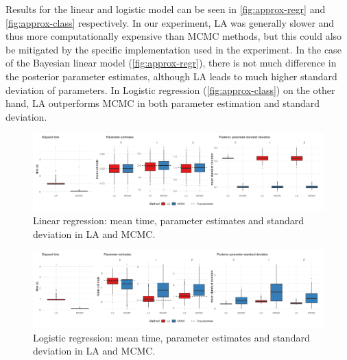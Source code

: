 Results for the linear and logistic model can be seen in \autoref{fig:approx-regr} and \autoref{fig:approx-class} respectively. In our experiment, LA was generally slower and thus more computationally expensive than MCMC methods, but this could also be mitigated by the specific implementation used in the experiment. In the case of the Bayesian linear model (\autoref{fig:approx-regr}), there is not much difference in the posterior parameter estimates, although LA leads to much higher standard deviation of parameters. In Logistic regression (\autoref{fig:approx-class}) on the other hand, LA outperforms MCMC in both parameter estimation and standard deviation.

\begin{figure}[htbp]
    \centering
    \includegraphics[width=\linewidth]{../figures/approx_regr.png}
    \caption{Linear regression: mean time, parameter estimates and standard deviation in LA and MCMC.}
    \label{fig:approx-regr}
\end{figure}

\begin{figure}[htbp]
    \centering
    \includegraphics[width=\linewidth]{../figures/approx_class.png}
    \caption{Logistic regression: mean time, parameter estimates and standard deviation in LA and MCMC.}
    \label{fig:approx-class}
\end{figure}

